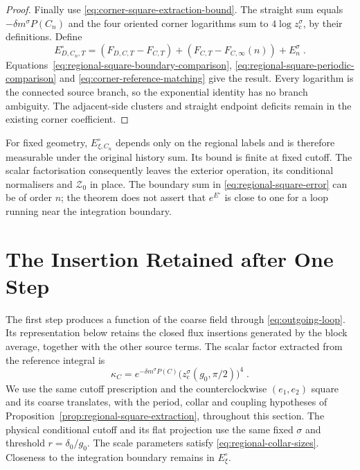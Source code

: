 \documentclass[11pt]{article}
\begin{document}
\begin{proof}
Finally use \eqref{eq:corner-square-extraction-bound}. The straight sum equals $-\delta m^\sigma P(C_n)$ and the four oriented corner logarithms sum to $4\log z_{\mathrm c}^\sigma$, by their definitions. Define
\begin{equation}
    E^\circ_{D,C_n,T}=(F_{D,C,T}-F_{C,T})
        +(F_{C,T}-F_{C,\infty}(n))+E_n^\sigma\;.
\end{equation}
Equations~\eqref{eq:regional-square-boundary-comparison}, \eqref{eq:regional-square-periodic-comparison} and \eqref{eq:corner-reference-matching} give the result. Every logarithm is the connected source branch, so the exponential identity has no branch ambiguity. The adjacent-side clusters and straight endpoint deficits remain in the existing corner coefficient.
\end{proof}

For fixed geometry, $E^\circ_{\xi,C_n}$ depends only on the regional labels and is therefore measurable under the original history sum. Its bound is finite at fixed cutoff. The scalar factorisation consequently leaves the exterior operation, its conditional normalisers and $\mathcal Z_0$ in place. The boundary sum in \eqref{eq:regional-square-error} can be of order $n$; the theorem does not assert that $e^{E^\circ}$ is close to one for a loop running near the integration boundary.

\section{The Insertion Retained after One Step}
\label{sec:remaining-physical-comparison}

The first step produces a function of the coarse field through \eqref{eq:outgoing-loop}. Its representation below retains the closed flux insertions generated by the block average, together with the other source terms. The scalar factor extracted from the reference integral is
\begin{equation}\label{eq:extracted-loop-scalar}
    \kappa_C=e^{-\delta m^\sigma P(C)}
        \bigl(z_{\mathrm c}^\sigma(g_0,\pi/2)\bigr)^4\;.
\end{equation}
We use the same cutoff prescription and the counterclockwise $(e_1,e_2)$ square and its coarse translates, with the period, collar and coupling hypotheses of Proposition~\ref{prop:regional-square-extraction}, throughout this section. The physical conditional cutoff and its flat projection use the same fixed $\sigma$ and threshold $r=\delta_0/g_0$. The scale parameters satisfy \eqref{eq:regional-collar-sizes}. Closeness to the integration boundary remains in $E^\circ_\xi$.
\end{document}
